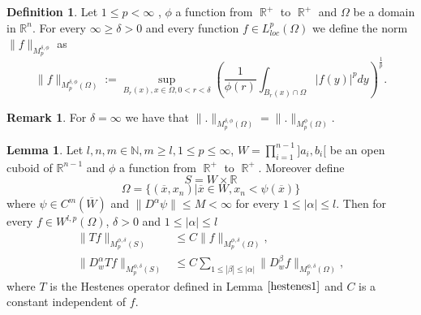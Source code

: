 \documentclass[12pt]{article}
\theoremstyle{definition}
\newtheorem{definition}{Definition}
\newtheorem{remark}{Remark}
\newtheorem{lemma}{Lemma}
\DeclareMathOperator\rr{\mathbb{R}}
\begin{document}
\begin{definition}
Let $1\le p< \infty$ , $\phi$ a function from $\rr^+$ to $\rr^+$ and $\Omega$ be a domain in $\mathbb{R}^n$. For every $\infty\ge\delta>0$ and every function $f \in L^p_{loc}(\Omega)$ we define the norm $\|f\|_{M^{\delta,\phi}_p}$ as
\[\| f\|_{M^{\delta,\phi}_p(\Omega)} := \sup_{B_r(x), x \in \Omega, 0<r<\delta} \left(  \frac{1}{\phi(r)}\int_{B_r(x)\cap \Omega} |f(y)|^p dy \right )^{\frac{1}{p}}.\]
\end{definition}

\begin{remark}
	For $\delta=\infty$ we have that $\| .\|_{M^{\delta,\phi}_p(\Omega)}=\| .\|_{M^\phi_p(\Omega)}.$
\end{remark}

\begin{lemma}\label{hmorrey1}
Let $l,n,m \in \mathbb{N},m\ge l, 1\le p \le \infty$, $W = \prod\limits_{i=1}^{n-1}]a_i,b_i[$ be an open cuboid of $\mathbb{R}^{n-1}$ and $\phi$ a function from $\rr^+$ to $\rr^+$. Moreover define
\[ S=W \times \mathbb{R} \]
\[\Omega =\{ (\overline x,x_n) | \overline x\in W, x_n<\psi(\overline x)  \} \]
where $\psi \in C^m(\overline W)$ and $\| D^{\alpha}\psi \|\le M <\infty $ for every $1\le|\alpha|\le l$. Then for every $f \in W^{l,p}(\Omega)$, $\delta>0$ and  $1\le |\alpha|\le l$
\begin{align}
\| Tf\|_{M_p^{\phi,\delta}(S)} &\le    C\| f\|_{M_p^{\phi,\delta}(\Omega)} ,\\
\| D^\alpha_w Tf\|_{M_p^{\phi,\delta}(S)} &\le   C\sum_{1\le |\beta|\le|\alpha| }\| D^\beta_wf\|_{M_p^{\phi,\delta}(\Omega)},
\end{align}
where $T$ is the Hestenes operator defined in Lemma $\ref{hestenes1}$ and $C$ is a constant independent of $f$.
\end{lemma}
\end{document}
